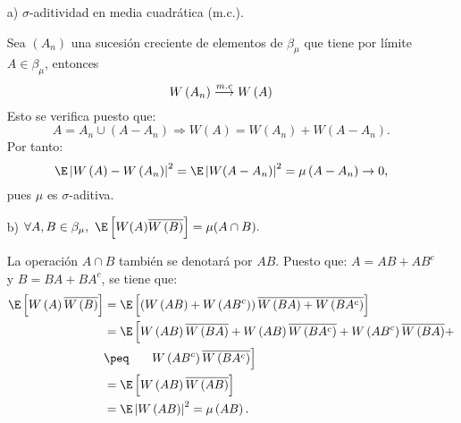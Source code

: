 \begin{enumerate}
\item[a)] $\sigma$-aditividad en media cuadr\'{a}tica (m.c.).

Sea $\left( A_{n} \right)$ una sucesi\'{o}n creciente de elementos de $\beta_{\mu }$ que tiene por l\'{i}mite $A\in \beta_{\mu }$, entonces
\[
W\left( A_{n} \right)\buildrel {m.c} \over \longrightarrow W\left( A \right)
\]
Esto se verifica puesto que: 
\[
A=A_{n}\cup \left( A-A_{n} \right)\Longrightarrow W\left( A \right)=W\left( 
A_{n} \right)+W\left( A-A_{n} \right).
\]
Por tanto: 
\[
\E\left| W\left( A \right)-W\left( A_{n} \right) \right|^{2}=\E\left| 
W(A-A_{n}) \right|^{2}=\mu \left( A-A_{n} \right)\to 0,
\]
pues $\mu$ es $\sigma $-aditiva.

\item[b)] $\forall A, B\in \beta_{\mu },\ \E\left[ W(A)\overline{W\left( B \right)} \right]=\mu (A\cap B).$

La operaci\'{o}n $A\cap B$ tambi\'{e}n se denotar\'{a} por $AB$. Puesto que: 
$A=AB+AB^{c}$ y $B=BA+BA^{c}$, se tiene que:
\begin{align*}
 \E\left[ W\left( A \right)\overline{W\left( B \right)} \right]
	&= \E\left[ \left( W\left( AB \right)+W\left( AB^{c} \right) \right)\overline{W\left( BA \right)+W\left( BA^{c} \right)} \right]\\
	&= \E\left[ W\left( AB \right)\overline{W\left( BA \right)}+W\left( AB  \right)\overline{W\left( BA^{c} \right)}+W\left( AB^{c} \right)\overline{W\left( BA   \right)}+\right.\\
	&\peq \phantom{\E[[}\left.W\left( AB^{c} \right)\overline{W\left( BA^{c} \right)} \right]\\
	&=\E\left[ W\left( AB \right)\overline{W\left( AB \right)} \right]\\
	&=\E\left| W\left(AB \right) \right|^{2}=\mu \left( AB \right).
\end{align*}
\end{enumerate}

